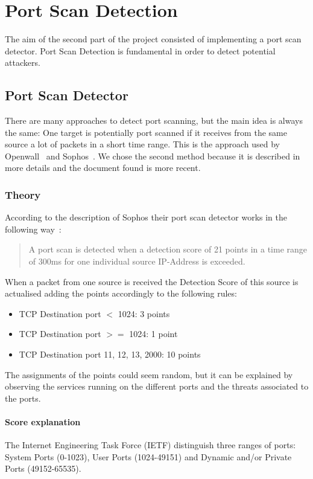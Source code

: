 \chapter{Port Scan Detection}
\label{sec:detector}
The aim of the second part of the project consisted of implementing
a port scan detector. Port Scan Detection is fundamental in order
to detect potential attackers.

\section{Port Scan Detector}
There are many approaches to detect port scanning, but the main idea
is always the same: One target is potentially port scanned if it receives
from the same source a lot of packets in a short time range.
This is the approach used by Openwall~\cite{scanlogd} and
Sophos~\cite{sophos}.
We chose the second method because it is described in more details and the document found
is more recent.
\subsection{Theory}
According to the description of Sophos their port scan detector works in the following way~\cite{sophos}:
\begin{quote}
	A port scan is detected when a detection score of 21 points
	in a time range of 300ms for one individual source IP-Address is exceeded.
\end{quote}
When a packet from one source is received the Detection Score of this source
is actualised adding the points accordingly to the following rules:
\begin{itemize}
	\item TCP Destination port $<$ 1024: 3 points
	\item TCP Destination port $>=$ 1024: 1 point
	\item TCP Destination port 11, 12, 13, 2000: 10 points
\end{itemize}
The assignments of the points could seem random, but it can be explained by observing the services running on the different ports and the threats associated to the ports.
\subsubsection{Score explanation}
The Internet Engineering Task Force (IETF) distinguish three ranges of ports: System Ports (0-1023), 
User Ports (1024-49151) and Dynamic and/or Private Ports (49152-65535).

